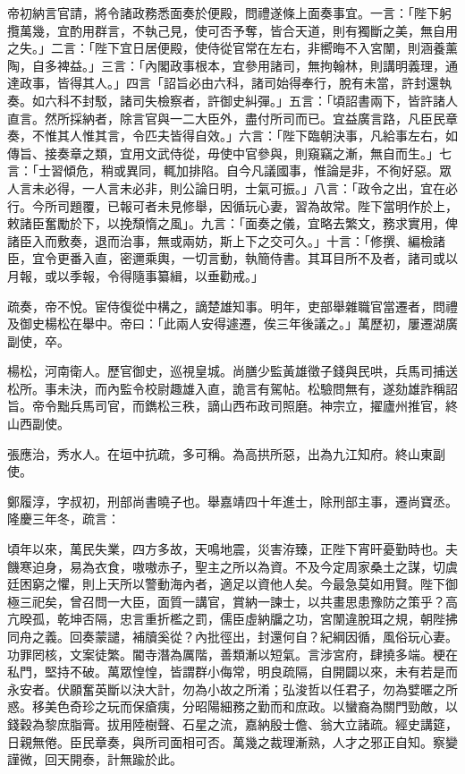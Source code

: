\begin{pinyinscope}
{{帝初納言官請，將令諸政務悉面奏於便殿，問禮遂條上面奏事宜。一言：「陛下躬攬萬幾，宜酌用群言，不執己見，使可否予奪，皆合天道，則有獨斷之美，無自用之失。」二言：「陛下宜日居便殿，使侍從官常在左右，非嚮晦不入宮闈，則涵養薰陶，自多裨益。」三言：「內閣政事根本，宜參用諸司，無拘翰林，則講明義理，通達政事，皆得其人。」四言「詔旨必由六科，諸司始得奉行，脫有未當，許封還執奏。如六科不封駁，諸司失檢察者，許御史糾彈。」五言：「頃詔書兩下，皆許諸人直言。然所採納者，除言官與一二大臣外，盡付所司而已。宜益廣言路，凡臣民章奏，不惟其人惟其言，令匹夫皆得自效。」六言：「陛下臨朝決事，凡給事左右，如傳旨、接奏章之類，宜用文武侍從，毋使中官參與，則窺竊之漸，無自而生。」七言：「士習傾危，稍或異同，輒加排陷。自今凡議國事，惟論是非，不徇好惡。眾人言未必得，一人言未必非，則公論日明，士氣可振。」八言：「政令之出，宜在必行。今所司題覆，已報可者未見修舉，因循玩心妻，習為故常。陛下當明作於上，敕諸臣奮勵於下，以挽頹惰之風」。九言：「面奏之儀，宜略去繁文，務求實用，俾諸臣入而敷奏，退而治事，無或兩妨，斯上下之交可久。」十言：「修撰、編檢諸臣，宜令更番入直，密邇乘輿，一切言動，執簡侍書。其耳目所不及者，諸司或以月報，或以季報，令得隨事纂緝，以垂勸戒。」

疏奏，帝不悅。宦侍復從中構之，謫楚雄知事。明年，吏部舉雜職官當遷者，問禮及御史楊松在舉中。帝曰：「此兩人安得遽遷，俟三年後議之。」萬歷初，屢遷湖廣副使，卒。

楊松，河南衛人。歷官御史，巡視皇城。尚膳少監黃雄徵子錢與民哄，兵馬司捕送松所。事未決，而內監令校尉趣雄入直，詭言有駕帖。松驗問無有，遂劾雄詐稱詔旨。帝令黜兵馬司官，而鐫松三秩，謫山西布政司照磨。神宗立，擢廬州推官，終山西副使。

張應治，秀水人。在垣中抗疏，多可稱。為高拱所惡，出為九江知府。終山東副使。

鄭履淳，字叔初，刑部尚書曉子也。舉嘉靖四十年進士，除刑部主事，遷尚寶丞。隆慶三年冬，疏言：

頃年以來，萬民失業，四方多故，天鳴地震，災害洊臻，正陛下宵旰憂勤時也。夫饑寒迫身，易為衣食，嗷嗷赤子，聖主之所以為資。不及今定周家桑土之謀，切虞廷困窮之懼，則上天所以警動海內者，適足以資他人矣。今最急莫如用賢。陛下御極三祀矣，曾召問一大臣，面質一講官，賞納一諫士，以共畫思患豫防之策乎？高亢暌孤，乾坤否隔，忠言重折檻之罰，儒臣虛納牖之功，宮闈違脫珥之規，朝陛拂同舟之義。回奏蒙譴，補牘奚從？內批徑出，封還何自？紀綱因循，風俗玩心妻。功罪罔核，文案徒繁。閽寺潛為厲階，善類漸以短氣。言涉宮府，肆撓多端。梗在私門，堅持不破。萬眾惶惶，皆謂群小侮常，明良疏隔，自開闢以來，未有若是而永安者。伏願奮英斷以決大計，勿為小故之所淆；弘浚哲以任君子，勿為嬖暱之所惑。移美色奇珍之玩而保瘡痍，分昭陽細務之勤而和庶政。以蠻裔為關門勁敵，以錢穀為黎庶脂膏。拔用陸樹聲、石星之流，嘉納殷士儋、翁大立諸疏。經史講筵，日親無倦。臣民章奏，與所司面相可否。萬幾之裁理漸熟，人才之邪正自知。察變謹微，回天開泰，計無踰於此。

}}
\end{pinyinscope}
